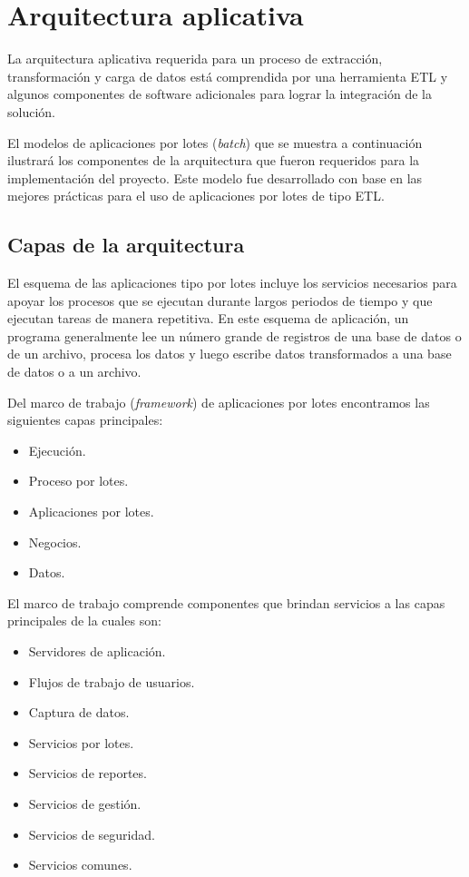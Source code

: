 \section{Arquitectura aplicativa}

La arquitectura aplicativa requerida para un proceso de extracción,
transformación y carga de datos está comprendida por una herramienta ETL y
algunos componentes de software adicionales para lograr la integración de la
solución.

El modelos de aplicaciones por lotes (\emph{batch}) que se muestra a
continuación ilustrará los componentes de la arquitectura que fueron requeridos
para la implementación del proyecto. Este modelo fue desarrollado con base en
las mejores prácticas para el uso de aplicaciones por lotes de tipo ETL.

\subsection{Capas de la arquitectura}

El esquema de las aplicaciones tipo por lotes incluye los servicios necesarios para
apoyar los procesos que se ejecutan durante largos periodos de tiempo y que
ejecutan tareas de manera repetitiva. En este esquema de aplicación, un programa
generalmente lee un número grande de registros de una base de datos o de un
archivo, procesa los datos y luego escribe datos transformados a una base de
datos o a un archivo.

Del marco de trabajo (\emph{framework}) de aplicaciones por lotes encontramos
las siguientes capas principales:

\begin{itemize}
\item Ejecución.
\item Proceso por lotes.
\item Aplicaciones por lotes.
\item Negocios.
\item Datos.
\end{itemize}

El marco de trabajo comprende componentes que brindan servicios a las capas
principales de la cuales son:

\begin{itemize}
\item Servidores de aplicación.
\item Flujos de trabajo de usuarios.
\item Captura de datos.
\item Servicios por lotes.
\item Servicios de reportes.
\item Servicios de gestión.
\item Servicios de seguridad.
\item Servicios comunes.
\end{itemize}

